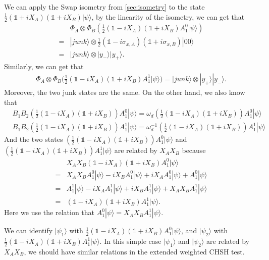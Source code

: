 \documentclass[11pt,letterpaper]{article}
\newcommand{\ket}[1]{|#1\rangle}
\newcommand{\x}{\otimes}
\newcommand{\1}{\mathbb{1}}
\theoremstyle{definition}
\begin{document}
We can apply the Swap isometry from \cref{sec:isometry} to the state $\frac{1}{2}(\1 + iX_A)(\1+ iX_B) \ket{\psi}$,
by the linearity of the isometry, we can get that 
\begin{align}
	&\Phi_A\x\Phi_B( \frac{1}{2} (\1 - iX_A)(\1+ iX_B) A_1^0\ket{\psi} ) \\
	= &\ket{junk} \x\frac{1}{2} (\1-i \sigma_{x,A})(\1 + i\sigma_{x,B})\ket{00}\\
	=& \ket{junk} \x \ket{y_-}\ket{y_+} .
\end{align} 
Similarly, we can get that 
\begin{align}
\Phi_A\x\Phi_B( \frac{1}{2} (\1 - iX_A)(\1+ iX_B) A_1^1 \ket{\psi} ) = \ket{junk} \x \ket{y_+}\ket{y_-}.
\end{align}
Moreover, the two junk states are the same.
On the other hand, we also know that 
\begin{align}
	&B_1B_2 (\frac{1}{2} (\1 - iX_A)(\1+ iX_B)) A_1^0 \ket{\psi} = \omega_d (\frac{1}{2} (\1 - iX_A)(\1+ iX_B)) A_1^0 \ket{\psi}\\
	&B_1B_2 (\frac{1}{2} (\1 - iX_A)(\1+ iX_B)) A_1^1 \ket{\psi} = \omega_d^{-1} (\frac{1}{2} (\1 - iX_A)(\1+ iX_B)) A_1^1 \ket{\psi}
\end{align}
And the two states $(\frac{1}{2} (\1 - iX_A)(\1+ iX_B)) A_1^0 \ket{\psi}$ and $(\frac{1}{2} (\1 - iX_A)(\1+ iX_B)) A_1^1 \ket{\psi}$
are related by $X_AX_B$ because
\begin{equation}
\label{eq:xaxb_trans}
\begin{aligned}
	&X_AX_B (\1-iX_A)(\1+iX_B) A_1^0 \ket{\psi} \\
	=& X_AX_B A_1^0 \ket{\psi} -iX_BA_1^0 \ket{\psi} + iX_AA_1^0\ket{\psi} + A_1^0\ket{\psi}\\
	=&A_1^1\ket{\psi} -iX_A A_1^1\ket{\psi} + iX_B A_1^1 \ket{\psi} + X_AX_BA_1^1\ket{\psi} \\
	=&(\1-iX_A)(\1+iX_B)A_1^1 \ket{\psi}.
\end{aligned}
\end{equation}
Here we use the relation that $A_1^0\ket{\psi} = X_AX_B A_1^1 \ket{\psi}$.

We can identify $\ket{\psi_1}$ with $\frac{1}{2} (\1 - iX_A)(\1+ iX_B) A_1^0 \ket{\psi}$, and
$\ket{\psi_2}$ with $\frac{1}{2} (\1 - iX_A)(\1+ iX_B) A_1^1 \ket{\psi}$.
In this simple case $\ket{\psi_1}$ and $\ket{\psi_2}$ are related by $X_AX_B$, we should have
similar relations in the extended weighted CHSH test.

\end{document}
